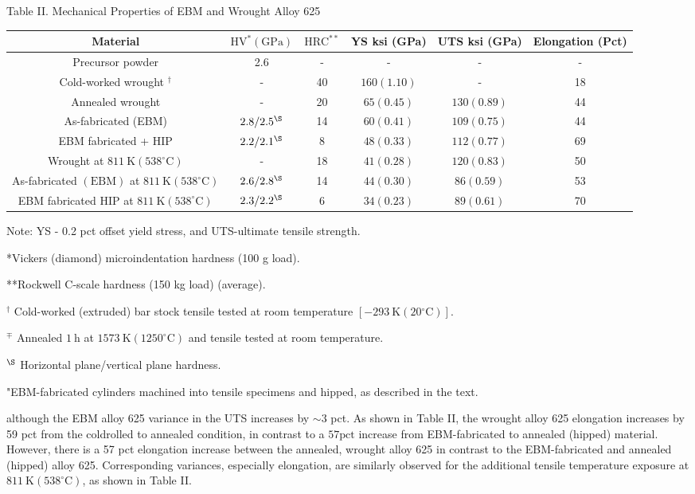 \documentclass[10pt]{article}
\begin{document}
Table II. Mechanical Properties of EBM and Wrought Alloy 625

\begin{center}
\begin{tabular}{|c|c|c|c|c|c|}
\hline
Material & $\mathrm{HV}^{*}(\mathrm{GPa})$ & $\mathrm{HRC}^{* *}$ & YS ksi (GPa) & UTS ksi (GPa) & Elongation (Pct) \\
\hline
Precursor powder & 2.6 & - & - & - & - \\
\hline
Cold-worked wrought ${ }^{\dagger}$ & - & 40 & $160(1.10)$ & - & 18 \\
\hline
Annealed wrought & - & 20 & $65(0.45)$ & $130(0.89)$ & 44 \\
\hline
As-fabricated (EBM) & $2.8 / 2.5^{\S}$ & 14 & $60(0.41)$ & $109(0.75)$ & 44 \\
\hline
EBM fabricated + HIP & $2.2 / 2.1^{\S}$ & 8 & $48(0.33)$ & $112(0.77)$ & 69 \\
\hline
Wrought at $811 \mathrm{~K}\left(538^{\circ} \mathrm{C}\right)$ & - & 18 & $41(0.28)$ & $120(0.83)$ & 50 \\
\hline
As-fabricated $(\mathrm{EBM})$ at $811 \mathrm{~K}\left(538^{\circ} \mathrm{C}\right)$ & $2.6 / 2.8^{\S}$ & 14 & $44(0.30)$ & $86(0.59)$ & 53 \\
\hline
EBM fabricated HIP at $811 \mathrm{~K}\left(538^{\circ} \mathrm{C}\right)$ & $2.3 / 2.2^{\S}$ & 6 & $34(0.23)$ & $89(0.61)$ & 70 \\
\hline
\end{tabular}
\end{center}

Note: YS - 0.2 pct offset yield stress, and UTS-ultimate tensile strength.

*Vickers (diamond) microindentation hardness (100 g load).

**Rockwell C-scale hardness (150 kg load) (average).

${ }^{\dagger}$ Cold-worked (extruded) bar stock tensile tested at room temperature $\left[-293 \mathrm{~K}\left(20{ }^{\circ} \mathrm{C}\right)\right]$.

${ }^{\mp}$ Annealed $1 \mathrm{~h}$ at $1573 \mathrm{~K}\left(1250^{\circ} \mathrm{C}\right)$ and tensile tested at room temperature.

${ }^{\S}$ Horizontal plane/vertical plane hardness.

"EBM-fabricated cylinders machined into tensile specimens and hipped, as described in the text.

although the EBM alloy 625 variance in the UTS increases by $\sim 3$ pct. As shown in Table II, the wrought alloy 625 elongation increases by 59 pct from the coldrolled to annealed condition, in contrast to a $57 \mathrm{pct}$ increase from EBM-fabricated to annealed (hipped) material. However, there is a 57 pct elongation increase between the annealed, wrought alloy 625 in contrast to the EBM-fabricated and annealed (hipped) alloy 625. Corresponding variances, especially elongation, are similarly observed for the additional tensile temperature exposure at $811 \mathrm{~K}\left(538^{\circ} \mathrm{C}\right)$, as shown in Table II.
\end{document}
